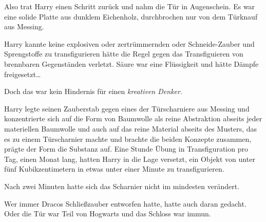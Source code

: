 Also trat Harry einen Schritt zurück und nahm die Tür in Augenschein. Es war eine solide Platte aus dunklem Eichenholz, durchbrochen nur von dem Türknauf aus Messing.

Harry kannte keine explosiven oder zertrümmernden oder Schneide-Zauber und Sprengstoffe zu transfigurieren hätte die Regel gegen das Transfiguieren von brennbaren Gegenständen verletzt. Säure war eine Flüssigkeit und hätte Dämpfe freigesetzt…

Doch das war kein Hindernis für einen \emph{kreativen Denker}.

Harry legte seinen Zauberstab gegen eines der Türscharniere aus Messing und konzentrierte sich auf die Form von Baumwolle als reine Abstraktion abseits jeder materiellen Baumwolle und auch auf das reine Material abseits des Musters, das es zu einem Türscharnier machte und brachte die beiden Konzepte zusammen, prägte der Form die Substanz auf. Eine Stunde Übung in Transfiguration pro Tag, einen Monat lang, hatten Harry in die Lage versetzt, ein Objekt von unter fünf Kubikzentimetern in etwas unter einer Minute zu transfigurieren.

Nach zwei Minuten hatte sich das Scharnier nicht im mindesten verändert.

Wer immer Dracos Schließzauber entworfen hatte, hatte auch daran gedacht. Oder die Tür war Teil von Hogwarts und das Schloss war immun.

